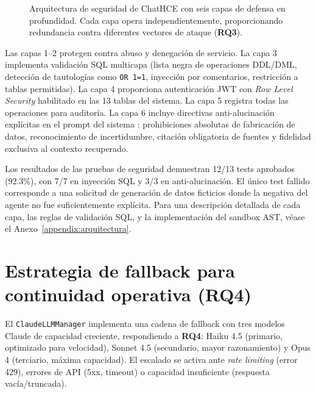\begin{figure}[t]
{%
}%
\caption{Arquitectura de seguridad de ChatHCE con seis capas de defensa en profundidad. Cada capa opera independientemente, proporcionando redundancia contra diferentes vectores de ataque (\textbf{RQ3}).}
\label{fig:seguridad}
\end{figure}

Las capas 1--2 protegen contra abuso y denegación de servicio. La capa 3 implementa validación \ac{SQL} multicapa (lista negra de operaciones DDL/DML, detección de tautologías como \texttt{OR 1=1}, inyección por comentarios, restricción a tablas permitidas). La capa 4 proporciona autenticación JWT con \textit{Row Level Security} habilitado en las 13 tablas del sistema. La capa 5 registra todas las operaciones para auditoría. La capa 6 incluye directivas anti-alucinación explícitas en el prompt del sistema \parencite{kim2025hallucination}: prohibiciones absolutas de fabricación de datos, reconocimiento de incertidumbre, citación obligatoria de fuentes y fidelidad exclusiva al contexto recuperado.

Los resultados de las pruebas de seguridad demuestran 12/13 tests aprobados (92.3\%), con 7/7 en inyección \ac{SQL} y 3/3 en anti-alucinación. El único test fallido corresponde a una solicitud de generación de datos ficticios donde la negativa del agente no fue suficientemente explícita. Para una descripción detallada de cada capa, las reglas de validación \ac{SQL}, y la implementación del sandbox \ac{AST}, véase el Anexo~\ref{appendix:arquitectura}.

\section{Estrategia de fallback para continuidad operativa (\acs{RQ}4)}
\label{sec:fallback}

El \texttt{ClaudeLLMManager} implementa una cadena de fallback con tres modelos Claude de capacidad creciente, respondiendo a \textbf{RQ4}: Haiku 4.5 (primario, optimizado para velocidad), Sonnet 4.5 (secundario, mayor razonamiento) y Opus 4 (terciario, máxima capacidad). El escalado se activa ante \textit{rate limiting} (error 429), errores de \ac{API} (5xx, timeout) o capacidad insuficiente (respuesta vacía/truncada).


